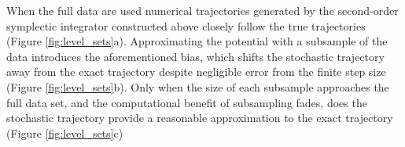 \documentclass{article}
\begin{document}
When the full data are used numerical trajectories generated by the second-order 
symplectic integrator constructed above closely follow the true trajectories 
(Figure \ref{fig:level_sets}a).  Approximating the potential with a subsample of the data 
introduces the aforementioned bias, which shifts the stochastic trajectory away from the 
exact trajectory despite negligible error from the finite step size (Figure \ref{fig:level_sets}b).
Only when the size of each subsample approaches the full data set, and the computational
benefit of subsampling fades, does the stochastic trajectory provide a reasonable
approximation to the exact trajectory (Figure \ref{fig:level_sets}c)

\begin{figure}
\centering
{}

\end{figure}
\end{document}
